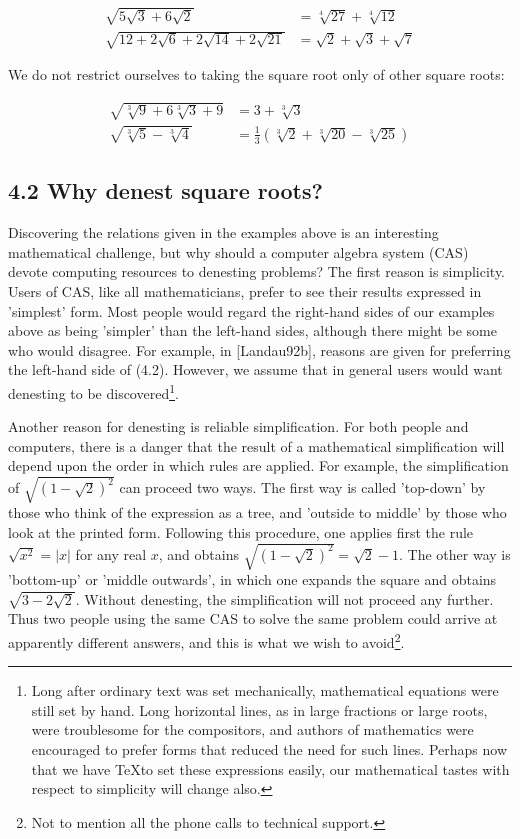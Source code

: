 \documentclass[11pt,letterpaper]{article}
\begin{document}
\begin{align*}
\sqrt{5 \sqrt{3}+6 \sqrt{2}} & =\sqrt[4]{27}+\sqrt[4]{12}  \tag{4.3}\label{eq:4.3}\\
\sqrt{12+2 \sqrt{6}+2 \sqrt{14}+2 \sqrt{21}} & =\sqrt{2}+\sqrt{3}+\sqrt{7} \tag{4.4}\label{eq:4.4}
\end{align*}


We do not restrict ourselves to taking the square root only of other square roots:


\begin{align*}
\sqrt{\sqrt[3]{9}+6 \sqrt[3]{3}+9} & =3+\sqrt[3]{3}  \tag{4.5}\label{eq:4.5}\\
\sqrt{\sqrt[3]{5}-\sqrt[3]{4}} & =\frac{1}{3}(\sqrt[3]{2}+\sqrt[3]{20}-\sqrt[3]{25}) \tag{4.6}\label{eq:4.6}
\end{align*}


\subsection*{4.2 Why denest square roots?}
Discovering the relations given in the examples above is an interesting mathematical challenge, but why should a computer algebra system (CAS) devote computing resources to denesting problems? The first reason is simplicity. Users of CAS, like all mathematicians, prefer to see their results expressed in 'simplest' form. Most people would regard the right-hand sides of our examples above as being 'simpler' than the left-hand sides, although there might be some who would disagree. For example, in [Landau92b], reasons are given for preferring the left-hand side of (4.2). However, we assume that in general users would want denesting to be discovered\footnote{Long after ordinary text was set mechanically, mathematical equations were still set by hand. Long horizontal lines, as in large fractions or large roots, were troublesome for the compositors, and authors of mathematics were encouraged to prefer forms that reduced the need for such lines. Perhaps now that we have \TeX to set these expressions easily, our mathematical tastes with respect to simplicity will change also.}.

Another reason for denesting is reliable simplification. For both people and computers, there is a danger that the result of a mathematical simplification will depend upon the order in which rules are applied. For example, the simplification of $\sqrt{(1-\sqrt{2})^{2}}$ can proceed two ways. The first way is called 'top-down' by those who think of the expression as a tree, and 'outside to middle' by those who look at the printed form. Following this procedure, one applies first the rule $\sqrt{x^{2}}=|x|$ for any real $x$, and obtains $\sqrt{(1-\sqrt{2})^{2}}=\sqrt{2}-1$. The other way is 'bottom-up' or 'middle outwards', in which one expands the square and obtains $\sqrt{3-2 \sqrt{2}}$. Without denesting, the simplification will not proceed any further. Thus two people using the same CAS to solve the same problem could arrive at apparently different answers, and this is what we wish to avoid\footnote{Not to mention all the phone calls to technical support.}.
\end{document}
